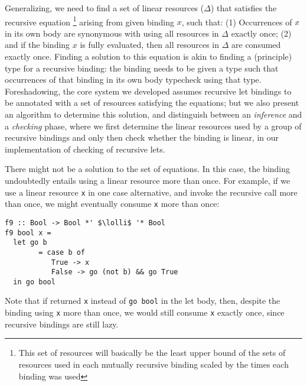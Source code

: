 \documentclass[acmsmall,review]{acmart}
\newcommand{\incode}[1]{\lstinline{#1}}
\newcommand{\lolli}{\multimap}
\begin{document}
Generalizing, we need to find a set of linear resources ($\Delta$) that satisfies the recursive equation
\footnote{This set of resources will basically be the least upper bound of the sets of resources used in each
mutually recursive binding scaled by the times each binding was used}
arising from given binding $x$, such that:
(1) Occurrences of $x$ in its own body are synonymous with using all resources in $\Delta$ exactly once;
(2) and if the binding $x$ is fully evaluated, then all resources in $\Delta$ are consumed exactly once.
Finding a solution to this equation is akin to finding a (principle) type for a
recursive binding: the binding needs to be given a type such that occurrences of
that binding in its own body typecheck using that type.
%
Foreshadowing, the core system we developed assumes recursive let bindings to
be annotated with a set of resources satisfying the equations; but we also
present an algorithm to determine this solution, and distinguish between an
\emph{inference} and a \emph{checking} phase, where we first determine the
linear resources used by a group of recursive bindings and only then check
whether the binding is linear, in our implementation of checking of recursive
lets.

There might not be a solution to the set of equations. In this case, the
binding undoubtedly entails using a linear resource more than once. For
example, if we use a linear resource \incode{x} in one case alternative, and invoke
the recursive call more than once, we might eventually consume \incode{x} more than
once:
%
\begin{noway}
\begin{lstlisting}
f9 :: Bool -> Bool *' $\lolli$ '* Bool
f9 bool x =
  let go b
        = case b of
           True -> x
           False -> go (not b) && go True
  in go bool
\end{lstlisting}
\end{noway}
Note that if returned \incode{x} instead of \incode{go bool} in the let body, then, despite
the binding using \incode{x} more than once, we would still consume \incode{x} exactly once,
since recursive bindings are still lazy.
\end{document}
